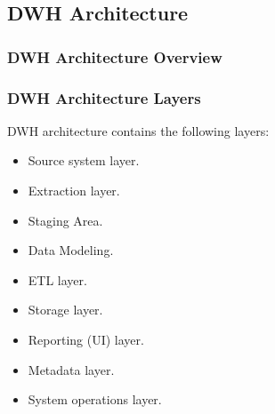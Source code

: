 \subsection{DWH Architecture}
\begin{frame}
\frametitle{DWH Architecture Overview}

\end{frame}
\begin{frame}
\frametitle{DWH Architecture Layers}

\begin{wideitemize}
	\item DWH architecture contains the following layers:
	\begin{itemize}[<+->]
		\item Source system layer.
		\item Extraction layer.
		\item Staging Area.
		\item Data Modeling.
		\item ETL layer.
		\item Storage layer.
		\item Reporting (UI) layer.
		\item Metadata layer.
		\item System operations layer.
	\end{itemize}
\end{wideitemize}

\end{frame}
\VideoClassification[column=2, colour=blue]